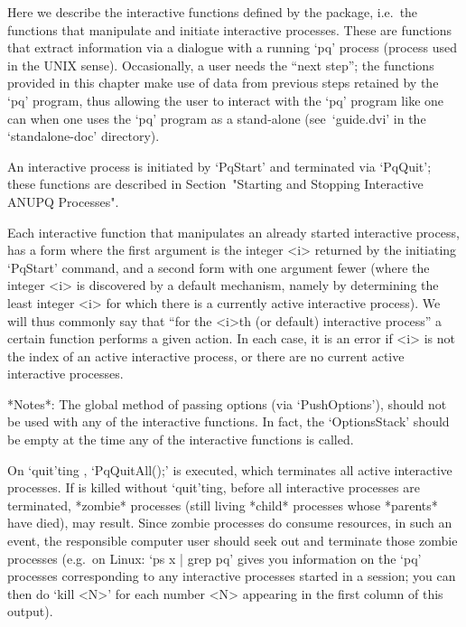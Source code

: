 

Here we describe  the  interactive  functions  defined  by  the  {\ANUPQ}
package, i.e.~the functions  that  manipulate  and  initiate  interactive
{\ANUPQ} processes. These are functions that extract  information  via  a
dialogue with a running `pq' process (process used in  the  UNIX  sense).
Occasionally, a user needs the ``next step''; the functions  provided  in
this chapter make use of data from previous steps retained  by  the  `pq'
program, thus allowing the user to interact with the  `pq'  program  like
one can when one uses the `pq' program as a stand-alone  (see~`guide.dvi'
in the `standalone-doc' directory).

An interactive {\ANUPQ} process is initiated by `PqStart' and  terminated
via `PqQuit'; these functions  are  described  in  Section~"Starting  and
Stopping Interactive ANUPQ Processes".

Each interactive {\ANUPQ} function that manipulates  an  already  started
interactive {\ANUPQ} process, has a form where the first argument is  the
integer <i> returned by the initiating `PqStart' command,  and  a  second
form with one argument fewer (where the integer <i> is  discovered  by  a
default mechanism, namely by determining the least integer <i> for  which
there is a currently active interactive {\ANUPQ} process). We  will  thus
commonly say that ``for  the  <i>th  (or  default)  interactive  {\ANUPQ}
process'' a certain function performs a given action. In each case, it is
an error if <i> is not the index of an  active  interactive  process,  or
there are no current active interactive processes.

*Notes*: 
The global method of passing options (via `PushOptions'), should  not  be
used with any of the interactive functions. In fact,  the  `OptionsStack'
should be empty at the time any of the interactive functions is called.

On `quit'ting  {\GAP}, `PqQuitAll();'  is executed, which  terminates all
active  interactive  {\ANUPQ} processes.   If  {\GAP}  is killed  without
`quit'ting,  before all  interactive {\ANUPQ}  processes  are terminated,
*zombie* processes  (still living *child* processes  whose *parents* have
died), may result. Since zombie processes do consume resources,  in  such
an event, the responsible computer user should  seek  out  and  terminate
those zombie processes (e.g.~on  Linux:  `ps  x  |  grep  pq'  gives  you
information on  the  `pq'  processes  corresponding  to  any  interactive
{\ANUPQ} processes started in a {\GAP} session; you  can  then  do  `kill
<N>' for each number <N> appearing in the first column of this output).

